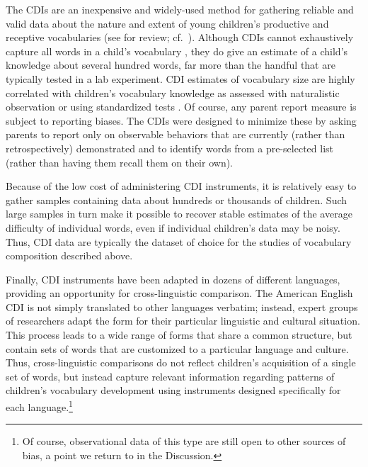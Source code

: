 \documentclass[
   11pt,
       ]{book}
\begin{document}
The CDIs are an inexpensive and widely-used method for gathering reliable and valid data about the nature and extent of young children's productive and receptive vocabularies (see \citealp{fenson1994} for review; cf.~\citealp{feldman2000, fenson2000}). Although CDIs cannot exhaustively capture all words in a child's vocabulary \citep{mayor2011}, they do give an estimate of a child's knowledge about several hundred words, far more than the handful that are typically tested in a lab experiment. CDI estimates of vocabulary size are highly correlated with children's vocabulary knowledge as assessed with naturalistic observation or using standardized tests \citep{fenson2007}. Of course, any parent report measure is subject to reporting biases. The CDIs were designed to minimize these by asking parents to report only on observable behaviors that are currently (rather than retrospectively) demonstrated and to identify words from a pre-selected list (rather than having them recall them on their own).

Because of the low cost of administering CDI instruments, it is relatively easy to gather samples containing data about hundreds or thousands of children. Such large samples in turn make it possible to recover stable estimates of the average difficulty of individual words, even if individual children's data may be noisy. Thus, CDI data are typically the dataset of choice for the studies of vocabulary composition described above.

Finally, CDI instruments have been adapted in dozens of different languages, providing an opportunity for cross-linguistic comparison. The American English CDI is not simply translated to other languages verbatim; instead, expert groups of researchers adapt the form for their particular linguistic and cultural situation. This process leads to a wide range of forms that share a common structure, but contain sets of words that are customized to a particular language and culture. Thus, cross-linguistic comparisons do not reflect children's acquisition of a single set of words, but instead capture relevant information regarding patterns of children's vocabulary development using instruments designed specifically for each language.\footnote{Of course, observational data of this type are still open to other sources of bias, a point we return to in the Discussion.}
\end{document}
